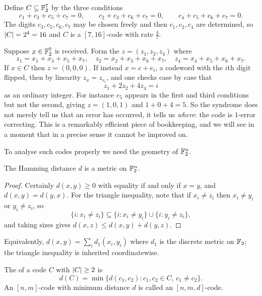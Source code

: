 \documentclass[a4paper]{scrartcl}
\begin{document}
\begin{example}\label{ex:ham74}
	Define $C \subseteq \mathbb{F}_2^7$ by the three conditions
	$$c_1 + c_3 + c_5 + c_7 = 0, \qquad c_2 + c_3 + c_6 + c_7 = 0, \qquad c_4 + c_5 + c_6 + c_7 = 0.$$
	The digits $c_3, c_5, c_6, c_7$ may be chosen freely and then $c_1, c_2, c_4$ are determined, so $\lvert C\rvert = 2^4 = 16$ and $C$ is a $[7,16]$-code with rate $\frac47$.

	Suppose $x \in \mathbb{F}_2^7$ is received. Form the  $z = (z_1, z_2, z_4)$ where
	$$z_1 = x_1+x_3+x_5+x_7, \quad z_2 = x_2+x_3+x_6+x_7, \quad z_4 = x_4+x_5+x_6+x_7.$$
	If $x \in C$ then $z = (0,0,0)$. If instead $x = c + e_i$, a codeword with the $i$th digit flipped, then by linearity $z_x = z_{e_i}$, and one checks case by case that
	$$z_1 + 2z_2 + 4z_4 = i$$
	as an ordinary integer. For instance $e_5$ appears in the first and third conditions but not the second, giving $z = (1,0,1)$ and $1 + 0 + 4 = 5$. So the syndrome does not merely tell us that an error has occurred, it tells us \emph{where}: the code is $1$-error correcting. This is a remarkably efficient piece of bookkeeping, and we will see in a moment that in a precise sense it cannot be improved on.
\end{example}

To analyse such codes properly we need the geometry of $\mathbb{F}_2^n$.

\begin{lemma}
	The Hamming distance $d$ is a metric on $\mathbb{F}_2^n$.
\end{lemma}

\begin{proof}
	Certainly $d(x,y) \ge 0$ with equality if and only if $x = y$, and $d(x,y) = d(y,x)$. For the triangle inequality, note that if $x_i \ne z_i$ then $x_i \ne y_i$ or $y_i \ne z_i$, so
	$$\{i : x_i \ne z_i\} \subseteq \{i : x_i \ne y_i\} \cup \{i : y_i \ne z_i\},$$
	and taking sizes gives $d(x,z) \le d(x,y) + d(y,z)$.
\end{proof}

Equivalently, $d(x,y) = \sum_i d_1(x_i,y_i)$ where $d_1$ is the discrete metric on $\mathbb{F}_2$; the triangle inequality is inherited coordinatewise.

\begin{definition}
	The  of a code $C$ with $\lvert C\rvert \ge 2$ is
	$$d(C) = \min\{d(c_1,c_2) : c_1, c_2 \in C, \, c_1 \ne c_2\}.$$
	An $[n,m]$-code with minimum distance $d$ is called an $[n,m,d]$-code.
\end{definition}
\end{document}

